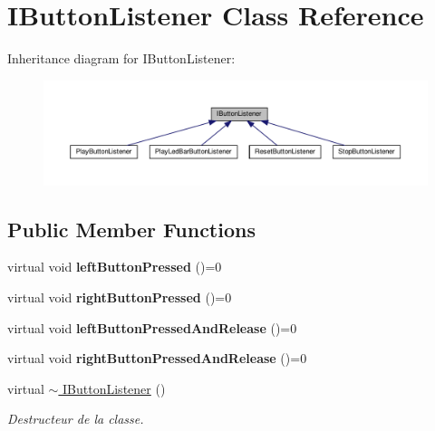 \hypertarget{classIButtonListener}{}\section{I\+Button\+Listener Class Reference}
\label{classIButtonListener}


Inheritance diagram for I\+Button\+Listener\+:
\nopagebreak
\begin{figure}[H]
\begin{center}
\leavevmode
\includegraphics[width=350pt]{classIButtonListener__inherit__graph}
\end{center}
\end{figure}
\subsection*{Public Member Functions}
\begin{DoxyCompactItemize}
\item 
\mbox{\label{classIButtonListener_af970e60ce593ae3fd886d9f19d621f6b}} 
virtual void {\bfseries left\+Button\+Pressed} ()=0
\item 
\mbox{\label{classIButtonListener_a3275bf1c3d56791184c72de0fa0b8f60}} 
virtual void {\bfseries right\+Button\+Pressed} ()=0
\item 
\mbox{\label{classIButtonListener_a090c715cb3c92bbdd16fa9b7c067c982}} 
virtual void {\bfseries left\+Button\+Pressed\+And\+Release} ()=0
\item 
\mbox{\label{classIButtonListener_a3249405a9584b4d8b3abdee6f9640b47}} 
virtual void {\bfseries right\+Button\+Pressed\+And\+Release} ()=0
\item 
\mbox{\label{classIButtonListener_a248e18aa0d982ede266f10566d2610e2}} 
virtual \hyperlink{classIButtonListener_a248e18aa0d982ede266f10566d2610e2}{$\sim$ I\+Button\+Listener} ()
\begin{DoxyCompactList}\small\item\em Destructeur de la classe. \end{DoxyCompactList}\end{DoxyCompactItemize}
